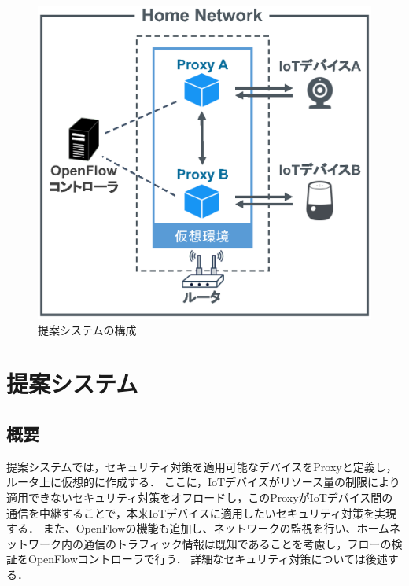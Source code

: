 \documentclass[Japanese]{dicomopapers}
\begin{document}
\begin{figure}[!tb]
	\centering
	\includegraphics[width=\linewidth]{img/system.eps}
	\caption{提案システムの構成}
	\label{fig:system}
\end{figure}

\section{提案システム}
\subsection{概要}
提案システムでは，セキュリティ対策を適用可能なデバイスをProxyと定義し，ルータ上に仮想的に作成する．
ここに，IoTデバイスがリソース量の制限により適用できないセキュリティ対策をオフロードし，このProxyがIoTデバイス間の通信を中継することで，本来IoTデバイスに適用したいセキュリティ対策を実現する．
また、OpenFlowの機能も追加し、ネットワークの監視を行い、ホームネットワーク内の通信のトラフィック情報は既知であることを考慮し，フローの検証をOpenFlowコントローラで行う．
詳細なセキュリティ対策については後述する．

\end{document}
